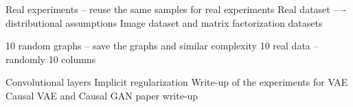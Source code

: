 Real experiments -- reuse the same samples for real experiments
Real dataset —- distributional assumptions
Image dataset and matrix factorization datasets

10 random graphs -- save the graphs and similar complexity
10 real data -- randomly 10 columns

Convolutional layers
Implicit regularization
Write-up of the experiments for VAE
Causal VAE and Causal GAN paper write-up
